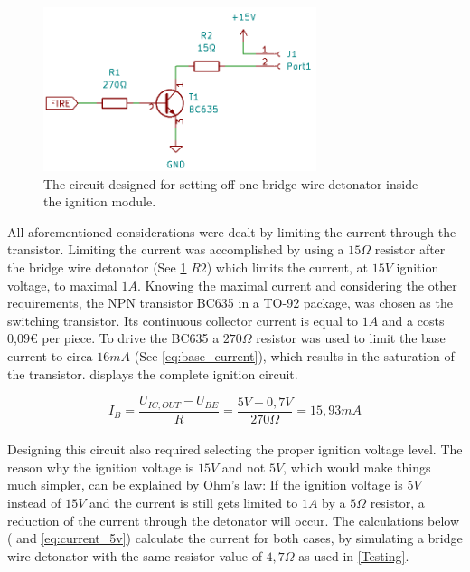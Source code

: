 \begin{figure}[!ht]
    \centering
    \includegraphics[width=8cm]{./Figures/module_ignitor.png}
    \caption{The circuit designed for setting off one bridge wire detonator inside the ignition module.}
    \label{fig:module_ignitor}     
\end{figure}

\noindent All aforementioned considerations were dealt by limiting the current through the transistor. Limiting the current was accomplished by using a $15\Omega$ resistor after the bridge wire detonator (See \cref{fig:module_ignitor} $R2$) which limits the current, at $15V$ ignition voltage, to maximal $1A$. Knowing the maximal current and considering the other requirements, the NPN transistor BC635 in a TO-92 package, was chosen as the switching transistor. Its continuous collector current is equal to $1A$ and a costs 0,09€ per piece. To drive the BC635 a $270\Omega$ resistor was used to limit the base current to circa $16mA$ (See \cref{eq:base_current}), which results in the saturation of the transistor.  displays the complete ignition circuit.

\begin{equation}
I_B=\frac{U_{IC,OUT}-U_{BE}}{R}=\frac{5V-0,7V}{270\Omega}=15,93mA
\label{eq:base_current}
\end{equation}\\

\noindent Designing this circuit also required selecting the proper ignition voltage level. The reason why the ignition voltage is $15V$ and not $5V$, which would make things much simpler, can be explained by Ohm's law: If the ignition voltage is $5V$ instead of $15V$ and the current is still gets limited to $1A$ by a $5\Omega$ resistor, a reduction of the current through the detonator will occur. The calculations below ( and \cref{eq:current_5v}) calculate the current for both cases, by simulating a bridge wire detonator with the same resistor value of $4,7\Omega$ as used in \cref{Testing}.

